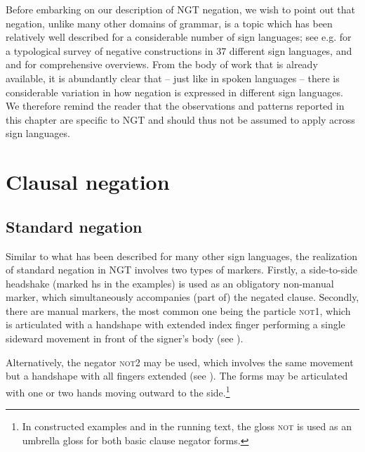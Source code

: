\documentclass[output=paper,colorlinks,citecolor=brown]{langscibook}
\begin{document}
Before embarking on our description of NGT negation, we wish to point out that negation, unlike many other domains of grammar, is a topic which has been relatively well described for a considerable number of sign languages; see e.g. \citet{Zeshan2004} for a typological survey of negative constructions in 37 different sign languages, and \citet{Quer2012} and \citet{Gokgoz2021} for comprehensive overviews. From the body of work that is already available, it is abundantly clear that – just like in spoken languages – there is considerable variation in how negation is expressed in different sign languages. We therefore remind the reader that the observations and patterns reported in this chapter are specific to NGT and should thus not be assumed to apply across sign languages.

\section{Clausal negation} 
\subsection{Standard negation} \label{subsec:ngt:stand-neg}
\largerpage

Similar to what has been described for many other sign languages, the realization of standard negation in NGT involves two types of markers. Firstly, a side-to-side headshake (marked hs in the examples) is used as an obligatory non-manual marker, which simultaneously accompanies (part of) the negated clause. Secondly, there are manual markers, the most common one being the particle \textsc{not1}, which is articulated with a handshape with extended index finger performing a single sideward movement in front of the signer’s body (see ).

Alternatively, the negator \textsc{not2} may be used, which involves the same movement but a handshape with all fingers extended (see ). The forms may be articulated with one or two hands moving outward to the side.\footnote{In constructed examples and in the running text, the gloss \textsc{not} is used as an umbrella gloss for both basic clause negator forms.}
\end{document}
